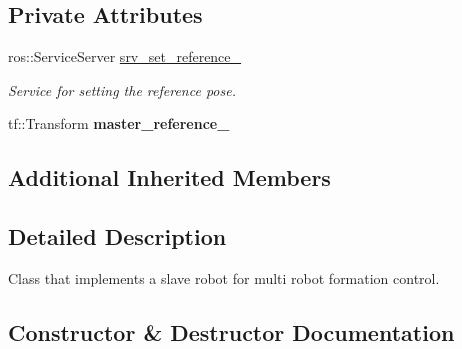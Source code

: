 \subsection*{Private Attributes}
\begin{DoxyCompactItemize}
\item 
ros\+::\+Service\+Server \hyperlink{classSlave_af2d09cda800ce6844f8734e484f38084}{srv\+\_\+set\+\_\+reference\+\_\+}\hypertarget{classSlave_af2d09cda800ce6844f8734e484f38084}{}\label{classSlave_af2d09cda800ce6844f8734e484f38084}

\begin{DoxyCompactList}\small\item\em Service for setting the reference pose. \end{DoxyCompactList}\item 
tf\+::\+Transform {\bfseries master\+\_\+reference\+\_\+}\hypertarget{classSlave_ae1f6ae8475022de445ba05d872b95e99}{}\label{classSlave_ae1f6ae8475022de445ba05d872b95e99}

\end{DoxyCompactItemize}
\subsection*{Additional Inherited Members}


\subsection{Detailed Description}
Class that implements a slave robot for multi robot formation control. 

\subsection{Constructor \& Destructor Documentation}
